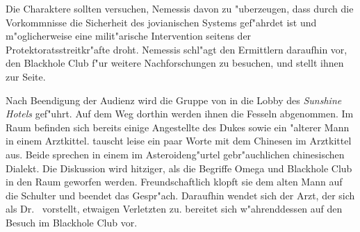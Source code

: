 
Die Charaktere sollten versuchen, Nemessis davon zu "uberzeugen, dass durch die Vorkommnisse die Sicherheit des jovianischen Systems gef"ahrdet ist und m"oglicherweise eine milit"arische Intervention seitens der Protektoratsstreitkr"afte droht. Nemessis schl"agt den Ermittlern daraufhin vor, den Blackhole Club f"ur weitere Nachforschungen zu besuchen, und stellt ihnen \xl{} zur Seite.

Nach Beendigung der Audienz wird die Gruppe von \xl{} in die Lobby des \emph{Sunshine Hotels} gef"uhrt. Auf dem Weg dorthin werden ihnen die Fesseln abgenommen. Im Raum befinden sich bereits einige Angestellte des Dukes sowie ein "alterer Mann in einem Arztkittel. \xl{} tauscht leise ein paar Worte mit dem Chinesen im Arztkittel aus. Beide sprechen in einem im Asteroideng"urtel gebr"auchlichen chinesischen Dialekt. Die Diskussion wird hitziger, als die Begriffe Omega und Blackhole Club in den Raum geworfen werden. Freundschaftlich klopft sie dem alten Mann auf die Schulter und beendet das Gespr"ach. Daraufhin wendet sich der Arzt, der sich als Dr.~  vorstellt, etwaigen Verletzten zu. \xl{} bereitet sich w"ahrenddessen auf den Besuch im Blackhole Club vor.

